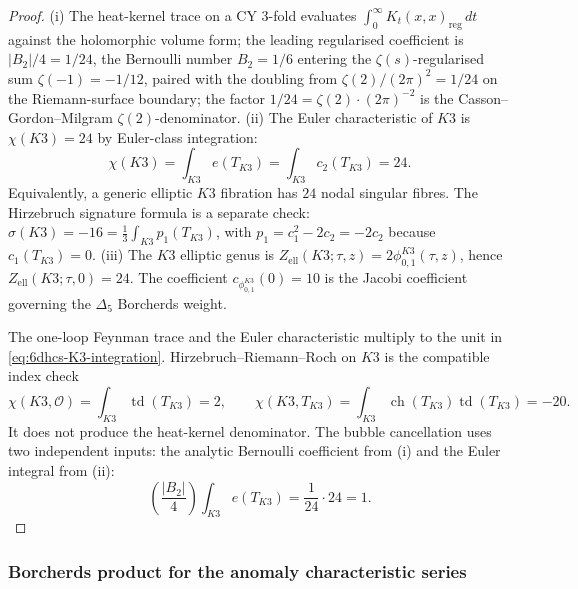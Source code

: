 \begin{proof}
\textup{(i)} The heat-kernel trace on a CY 3-fold evaluates
$\int_0^\infty K_t(x,x)_{\mathrm{reg}}\,dt$ against the holomorphic
volume form; the leading regularised coefficient is $|B_2|/4=1/24$,
the Bernoulli number $B_2=1/6$ entering the
$\zeta(s)$-regularised sum $\zeta(-1)=-1/12$, paired with the
doubling from $\zeta(2)/(2\pi)^2=1/24$ on the Riemann-surface
boundary; the factor $1/24=\zeta(2)\cdot(2\pi)^{-2}$ is the
Casson--Gordon--Milgram $\zeta(2)$-denominator.
\textup{(ii)} The Euler characteristic of $K3$ is $\chi(K3)=24$ by
Euler-class integration:
\[
 \chi(K3)=\int_{K3}e(T_{K3})
 =\int_{K3}c_2(T_{K3})=24 .
\]
Equivalently, a generic elliptic \(K3\) fibration has \(24\) nodal
singular fibres. The Hirzebruch signature formula is a separate check:
\(\sigma(K3)=-16=\frac13\int_{K3}p_1(T_{K3})\), with
\(p_1=c_1^2-2c_2=-2c_2\) because \(c_1(T_{K3})=0\).
\textup{(iii)} The $K3$ elliptic genus is
\(Z_{\mathrm{ell}}(K3;\tau,z)=2\phi_{0,1}^{K3}(\tau,z)\), hence
\(Z_{\mathrm{ell}}(K3;\tau,0)=24\). The coefficient
\(c_{\phi_{0,1}^{K3}}(0)=10\) is the Jacobi coefficient governing the
\(\Delta_5\) Borcherds weight.

The one-loop Feynman trace and the Euler characteristic multiply to the
unit in \eqref{eq:6dhcs-K3-integration}. Hirzebruch--Riemann--Roch on
\(K3\) is the compatible index check
\[
\chi(K3,\mathcal{O})=\int_{K3}\operatorname{td}(T_{K3})=2,\qquad
\chi(K3,T_{K3})=\int_{K3}\operatorname{ch}(T_{K3})\operatorname{td}(T_{K3})=-20.
\]
It does not produce the heat-kernel denominator. The bubble cancellation
uses two independent inputs: the analytic Bernoulli coefficient from
\textup{(i)} and the Euler integral from \textup{(ii)}:
\begin{equation}\label{eq:6dhcs-24-unified}
 \left(\frac{|B_2|}{4}\right)\int_{K3}e(T_{K3})
 =
 \frac{1}{24}\cdot 24
 =
 1 .
\end{equation}
\end{proof}

\subsubsection{Borcherds product for the anomaly characteristic series}
\label{subsubsec:6dhcs-borcherds-exp}

